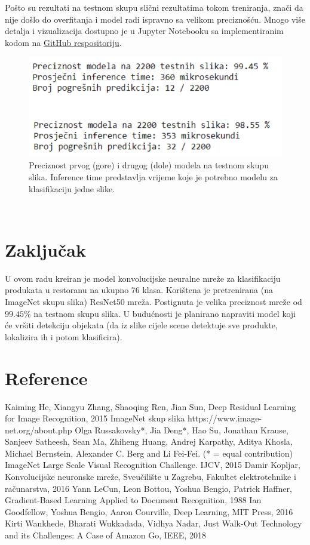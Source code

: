 \documentclass[conference]{IEEEtran}
\begin{document}
Pošto su rezultati na testnom skupu slični rezultatima tokom treniranja, znači da nije došlo do overfitanja i model radi ispravno sa velikom preciznošću. Mnogo više detalja i vizualizacija dostupno je u Jupyter Notebooku sa implementiranim kodom na \href{https://github.com/adisabolic/product_classification}{GitHub respositoriju}.

\begin{figure}[htbp]
\centerline{\includegraphics[width=\columnwidth]{fig7.png}}
\caption{Preciznost prvog (gore) i drugog (dole) modela na testnom skupu slika. Inference time predstavlja vrijeme koje je potrebno modelu za klasifikaciju jedne slike.}
\label{fig7}
\end{figure}
\\

\section{Zaključak}

U ovom radu kreiran je model konvolucijske neuralne mreže za klasifikaciju produkata u restoranu na ukupno $76$ klasa. Korištena je pretrenirana (na ImageNet \cite{b2} skupu slika) ResNet50 \cite{b1} mreža. Postignuta je velika preciznost mreže od $99.45\%$ na testnom skupu slika. U budućnosti je planirano napraviti model koji će vršiti detekciju objekata (da iz slike cijele scene detektuje sve produkte, lokalizira ih i potom klasificira). 


\section{Reference}
\begin{thebibliography}{00}
 Kaiming He, Xiangyu Zhang, Shaoqing Ren, Jian Sun, Deep Residual Learning for Image Recognition, 2015
 ImageNet skup slika https://www.image-net.org/about.php
 Olga Russakovsky*, Jia Deng*, Hao Su, Jonathan Krause, Sanjeev Satheesh, Sean Ma, Zhiheng Huang, Andrej Karpathy, Aditya Khosla, Michael Bernstein, Alexander C. Berg and Li Fei-Fei. (* = equal contribution) ImageNet Large Scale Visual Recognition Challenge. IJCV, 2015
 Damir Kopljar, Konvolucijske neuronske mreže, Sveučilište u Zagrebu, Fakultet elektrotehnike i računarstva, 2016 
 Yann LeCun, Leon Bottou, Yoshua Bengio, Patrick Haffner, Gradient-Based Learning Applied to Document Recognition, 1988
 Ian Goodfellow, Yoshua Bengio, Aaron Courville, Deep Learning, MIT Press, 2016
 Kirti Wankhede, Bharati Wukkadada, Vidhya Nadar, Just Walk-Out Technology and its Challenges: A Case of Amazon Go, IEEE, 2018

\end{thebibliography}
\end{document}

